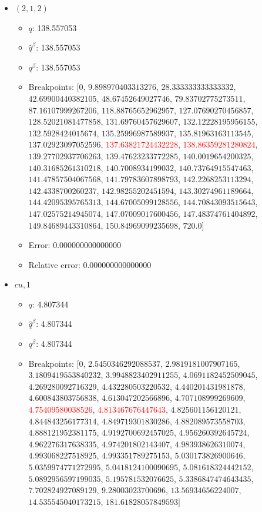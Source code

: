 \documentclass{article}%
\begin{document}
\begin{itemize}
\begin{itemize}
		\item Error: 0.000000000000000%
		\item Relative error: 0.000000000000000%
	\end{itemize}%
	\item $(2, 1, 2)$%
	\begin{itemize}%
		\item $q$: 138.557053%
		\item $\hat{q}^\beta$: 138.557053%
		\item $q^\beta$: 138.557053%
		\item Breakpoints: $[$$0$, $9.898970403313276$, $28.333333333333332$, $42.69900440382105$, $48.67452649027746$, $79.83702775273511$, $87.16107999267206$, $118.88765652962957$, $127.07690270456857$, $128.52021081477858$, $131.69760457629607$, $132.12228195956155$, $132.5928424015674$, $135.25996987589937$, $135.81963163113545$, $137.02923097052596$, \textcolor{red}{$137.63821724432228$}, \textcolor{red}{$138.86359281280824$}, $139.27702937706263$, $139.47623233772285$, $140.0019654200325$, $140.31685261310218$, $140.7008934199032$, $140.73764915547463$, $141.47857504067568$, $141.79783607898793$, $142.2268253113294$, $142.4338700260237$, $142.98255202451594$, $143.30274961189664$, $144.42095395765313$, $144.67005099128556$, $144.70843093515643$, $147.02575214945074$, $147.07009017600456$, $147.48374761404892$, $149.84689443310864$, $150.84969099235698$, $720.0$$]$%
		\item Error: 0.000000000000000%
		\item Relative error: 0.000000000000000%
	\end{itemize}%
	\item $\textit{cu},1$%
	\begin{itemize}%
		\item $q$: 4.807344%
		\item $\hat{q}^\beta$: 4.807344%
		\item $q^\beta$: 4.807344%
		\item Breakpoints: $[$$0$, $2.5450346292088537$, $2.9819181007907165$, $3.1809419553840232$, $3.9948823402911255$, $4.0691182452509045$, $4.269280092716329$, $4.432280503220532$, $4.440201431981878$, $4.600843803756838$, $4.613047202566896$, $4.707108999269609$, \textcolor{red}{$4.75409580038526$}, \textcolor{red}{$4.813467676447643$}, $4.825601156120121$, $4.844843256177314$, $4.849719301830286$, $4.882089573558703$, $4.888121952381175$, $4.9192700692457025$, $4.956260392645724$, $4.962276317638335$, $4.974201802143407$, $4.983938626310074$, $4.993068227518925$, $4.993351789275153$, $5.030173826900646$, $5.0359974771272995$, $5.0418124100090695$, $5.081618324442152$, $5.0892956597199035$, $5.195781532076625$, $5.3386847474643435$, $7.702824927089129$, $9.28003023700696$, $13.56934656224007$, $14.535545040173215$, $181.61828057849593$$]$%

\end{itemize}
\end{itemize}
\end{document}

